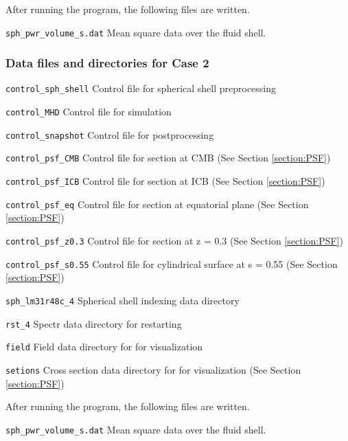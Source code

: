  After running the program, the following files are written.
\begin{description}
\item{\tt sph\_pwr\_volume\_s.dat}   Mean square data over the fluid shell.
\end{description}

%
\subsubsection{Data files and directories for Case 2}
\label{section:bench_case2}
%
\begin{description}
\item{\tt control\_sph\_shell}	Control file for spherical shell preprocessing
\item{\tt control\_MHD}		Control file for simulation
\item{\tt control\_snapshot}	Control file for postprocessing
\item{\tt control\_psf\_CMB}	Control file for section at CMB (See Section \ref{section:PSF})
\item{\tt control\_psf\_ICB}		Control file for section at ICB (See Section \ref{section:PSF})
\item{\tt control\_psf\_eq}		Control file for section at equatorial plane (See Section \ref{section:PSF})
\item{\tt control\_psf\_z0.3}	Control file for section at z = 0.3  (See Section \ref{section:PSF})
\item{\tt control\_psf\_s0.55}	Control file for cylindrical surface at s = 0.55 (See Section \ref{section:PSF})
\item{\tt sph\_lm31r48c\_4} 	Spherical shell indexing data directory
\item{\tt rst\_4}				Spectr data directory for restarting
\item{\tt field}				Field data directory for for visualization
\item{\tt setions}			Cross section data directory for for visualization (See Section \ref{section:PSF})
\end{description}

 After running the program, the following files are written.
\begin{description}
\item{\tt sph\_pwr\_volume\_s.dat}   Mean square data over the fluid shell.
\end{description}
%
